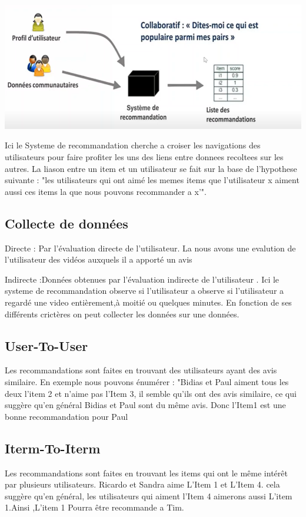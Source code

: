 \documentclass[12pt,a4paper]{article}
\begin{document}
\includegraphics[width=1\linewidth]{Capture2}




 Ici le Systeme de recommandation cherche a croiser les navigations des utilisateurs pour faire profiter les uns des liens entre donnees recoltees sur les autres. La liason entre un item et un utilisateur se fait sur la base de l'hypothese suivante : "les utilisateurs qui ont aimé les memes items que l'utilisateur x aiment aussi ces items la que nous pouvons recommander a x'".
 
 \subsection{Collecte de données}
 Directe : Par l'évaluation directe de l'utilisateur. La nous avons une evalution de l'utilisateur des vidéos auxquels il a apporté un avis
 
Indirecte :Données obtenues par l'évaluation indirecte de l'utilisateur . Ici le systeme de recommandation observe si l'utilisateur a observe si l'utilisateur a regardé une video entièrement,à moitié ou quelques minutes. En fonction de ses différents crictères on peut collecter les données sur une données.

\subsection{User-To-User}
Les recommandations sont faites en trouvant des utilisateurs ayant des avis similaire. En exemple nous pouvons énumérer : "Bidias et Paul aiment tous les deux l'item 2 et n'aime pas l'Item 3, il semble qu'ils ont des avis similaire, ce qui suggère qu'en général Bidias et Paul sont du même avis. Donc l'Item1 est une bonne recommandation pour Paul
\subsection{Iterm-To-Iterm}
Les recommandations sont faites en trouvant les items qui ont le même intérêt par plusieurs utilisateurs. Ricardo et Sandra aime L'Item 1 et L'Item 4. cela suggère qu'en général, les utilisateurs qui aiment l'Item 4 aimerons aussi L'item 1.Ainsi ,L'item 1 Pourra être recommande a Tim. 
\end{document}
